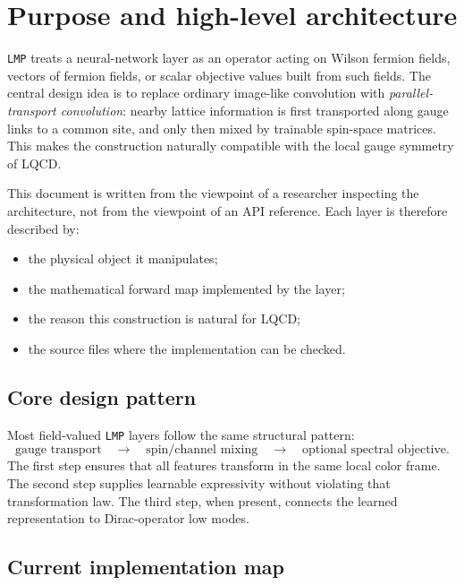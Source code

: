 \documentclass[11pt]{article}
\newcommand{\LMP}{\texttt{LMP}}
\begin{document}
\tableofcontents
\newpage

\section{Purpose and high-level architecture}

\LMP{} treats a neural-network layer as an operator acting on Wilson fermion
fields, vectors of fermion fields, or scalar objective values built from such
fields. The central design idea is to replace ordinary image-like convolution
with \emph{parallel-transport convolution}: nearby lattice information is first
transported along gauge links to a common site, and only then mixed by trainable
spin-space matrices. This makes the construction naturally compatible with the
local gauge symmetry of LQCD.

This document is written from the viewpoint of a researcher inspecting the
architecture, not from the viewpoint of an API reference. Each layer is
therefore described by:
\begin{itemize}[leftmargin=*]
  \item the physical object it manipulates;
  \item the mathematical forward map implemented by the layer;
  \item the reason this construction is natural for LQCD;
  \item the source files where the implementation can be checked.
\end{itemize}

\subsection{Core design pattern}

Most field-valued \LMP{} layers follow the same structural pattern:
\[
  \boxed{
  \text{gauge transport}
  \quad\longrightarrow\quad
  \text{spin/channel mixing}
  \quad\longrightarrow\quad
  \text{optional spectral objective}
  }.
\]
The first step ensures that all features transform in the same local color
frame. The second step supplies learnable expressivity without violating that
transformation law. The third step, when present, connects the learned
representation to Dirac-operator low modes.

\subsection{Current implementation map}
\end{document}
